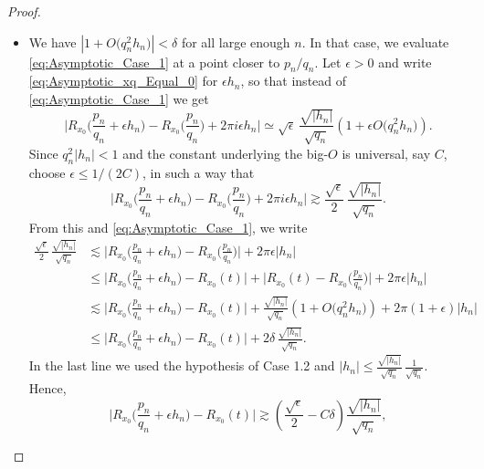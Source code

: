 \documentclass[10pt,a4paper]{amsart}
\begin{document}
\begin{proof}
\begin{itemize}
\begin{itemize}
	\item[\textbf{Case 1.2.}] We have $\left|  1 + O\big( q_n^2 h_n \big) \right| < \delta$ for all large enough $n$.
	In that case, we evaluate \eqref{eq:Asymptotic_Case_1} at a point closer to $p_n/q_n$.
	Let $\epsilon > 0$ and write \eqref{eq:Asymptotic_xq_Equal_0} for $\epsilon h_n$, so that instead of  \eqref{eq:Asymptotic_Case_1} we get
	\begin{equation}
\Big|   R_{x_0} \Big( \frac{p_n}{q_n} + \epsilon h_n \Big)  - R_{x_0}\Big( \frac{p_n}{q_n} \Big) + 2\pi i \epsilon h_n \Big|   
 \simeq \sqrt{\epsilon} \, \frac{\sqrt{|h_n|}}{\sqrt{q_n}} \left(  1 + \epsilon O\big( q_n^2 h_n \big) \right).
\end{equation}
Since $q_n^2 |h_n| < 1$ and the constant underlying the big-$O$ is universal, say $C$, choose $\epsilon \leq 1/(2C)$, in such a way that 
\begin{equation}
\Big| R_{x_0} \Big( \frac{p_n}{q_n} + \epsilon h_n \Big)  - R_{x_0}\Big( \frac{p_n}{q_n} \Big) + 2\pi i \epsilon h_n  \Big|   
\gtrsim  \frac{\sqrt{\epsilon}}{2} \, \frac{\sqrt{|h_n|}}{\sqrt{q_n}}.
\end{equation}
From this and \eqref{eq:Asymptotic_Case_1}, we write
\begin{equation}
\begin{split}
\frac{\sqrt{\epsilon}}{2} \, \frac{\sqrt{|h_n|}}{\sqrt{q_n}} 
& \lesssim \Big| R_{x_0} \Big( \frac{p_n}{q_n} + \epsilon h_n \Big)  - R_{x_0}\Big( \frac{p_n}{q_n} \Big) \Big| + 2\pi \epsilon |h_n|  \\
& \leq \Big| R_{x_0} \Big( \frac{p_n}{q_n} + \epsilon h_n \Big)  - R_{x_0}( t ) \Big| + \Big| R_{x_0} ( t )  - R_{x_0}\Big( \frac{p_n}{q_n} \Big) \Big| + 2\pi \epsilon |h_n| \\
& \lesssim \Big| R_{x_0} \Big( \frac{p_n}{q_n} + \epsilon h_n \Big)  - R_{x_0}( t ) \Big| + \frac{\sqrt{|h_n|}}{\sqrt{q_n}} \left(  1 + O\big( q_n^2 h_n \big) \right) + 2\pi (1 +  \epsilon) |h_n| \\
& \leq \Big| R_{x_0} \Big( \frac{p_n}{q_n} + \epsilon h_n \Big)  - R_{x_0}( t ) \Big| + 2\delta\, \frac{\sqrt{|h_n|}}{\sqrt{q_n}}.
\end{split}
\end{equation} 
In the last line we used the hypothesis of Case 1.2 and $|h_n| \leq \frac{\sqrt{|h_n|}}{\sqrt{q_n}} \, \frac{1}{\sqrt{q_n}}$.
Hence, 
 \begin{equation}
 \Big| R_{x_0} \Big( \frac{p_n}{q_n} + \epsilon h_n \Big)  - R_{x_0}( t ) \Big| 
 \gtrsim \left(  \frac{\sqrt{\epsilon}}{2}  - C\delta \right)   \frac{\sqrt{|h_n|}}{\sqrt{q_n}},

\end{equation}
\end{itemize}
\end{itemize}
\end{proof}
\end{document}
